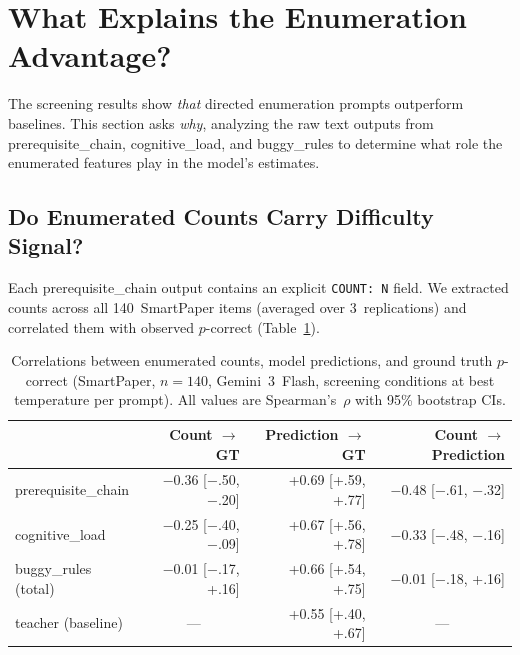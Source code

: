 
\section{What Explains the Enumeration Advantage?}\label{sec:mechanism}

The screening results show \emph{that} directed enumeration prompts outperform baselines. This section asks \emph{why}, analyzing the raw text outputs from prerequisite\_chain, cognitive\_load, and buggy\_rules to determine what role the enumerated features play in the model's estimates.

\subsection{Do Enumerated Counts Carry Difficulty Signal?}\label{sec:count-signal}

Each prerequisite\_chain output contains an explicit \texttt{COUNT: N} field. We extracted counts across all 140~SmartPaper items (averaged over 3~replications) and correlated them with observed $p$-correct (Table~\ref{tab:mechanism}).

\begin{table}[t]
\caption{Correlations between enumerated counts, model predictions, and ground truth $p$-correct (SmartPaper, $n=140$, Gemini~3~Flash, screening conditions at best temperature per prompt). All values are Spearman's~$\rho$ with 95\% bootstrap CIs.}\label{tab:mechanism}
\centering\footnotesize
\begin{tabular}{@{}lrrr@{}}
\toprule
& Count $\to$ GT & Prediction $\to$ GT & Count $\to$ Prediction \\
\midrule
prerequisite\_chain & $-$0.36 [$-$.50, $-$.20] & +0.69 [+.59, +.77] & $-$0.48 [$-$.61, $-$.32] \\
cognitive\_load     & $-$0.25 [$-$.40, $-$.09] & +0.67 [+.56, +.78] & $-$0.33 [$-$.48, $-$.16] \\
buggy\_rules (total)& $-$0.01 [$-$.17, +.16] & +0.66 [+.54, +.75] & $-$0.01 [$-$.18, +.16] \\
\addlinespace
teacher (baseline)  & \multicolumn{1}{c}{---} & +0.55 [+.40, +.67] & \multicolumn{1}{c}{---} \\
\bottomrule
\end{tabular}
\end{table}

